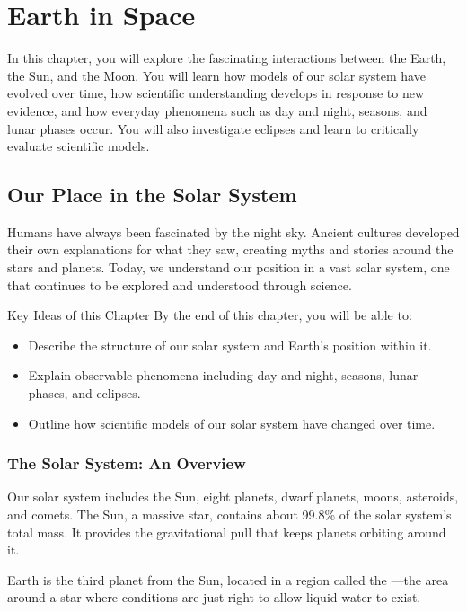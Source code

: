\chapter{Earth in Space}

In this chapter, you will explore the fascinating interactions between the Earth, the Sun, and the Moon. You will learn how models of our solar system have evolved over time, how scientific understanding develops in response to new evidence, and how everyday phenomena such as day and night, seasons, and lunar phases occur. You will also investigate eclipses and learn to critically evaluate scientific models.

\section{Our Place in the Solar System}

Humans have always been fascinated by the night sky. Ancient cultures developed their own explanations for what they saw, creating myths and stories around the stars and planets. Today, we understand our position in a vast solar system, one that continues to be explored and understood through science.

\begin{keyconcept}{Key Ideas of this Chapter}
By the end of this chapter, you will be able to:
\begin{itemize}
    \item Describe the structure of our solar system and Earth's position within it.
    \item Explain observable phenomena including day and night, seasons, lunar phases, and eclipses.
    \item Outline how scientific models of our solar system have changed over time.
\end{itemize}
\end{keyconcept}

\subsection{The Solar System: An Overview}

Our solar system includes the Sun, eight planets, dwarf planets, moons, asteroids, and comets. The Sun, a massive star, contains about 99.8\% of the solar system's total mass. It provides the gravitational pull that keeps planets orbiting around it.

Earth is the third planet from the Sun, located in a region called the —the area around a star where conditions are just right to allow liquid water to exist.

